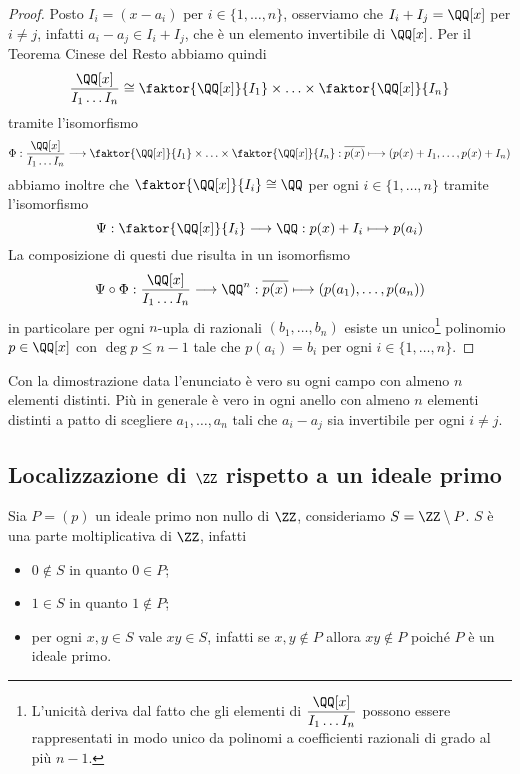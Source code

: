 \documentclass[11pt]{scrartcl}
\begin{document}
\begin{proof}
    Posto $I_i = (x - a_i)$ per $i \in \{1, \ldots, n\}$, osserviamo che 
    $I_i + I_j = \QQ[x]$ per $i \neq j$, infatti $a_i - a_j \in I_i + I_j$, 
    che è un elemento invertibile di $\QQ[x]$. Per il Teorema Cinese del Resto
    abbiamo quindi
    \[
        \frac{\QQ[x]}{I_1\ldots I_n} \cong \faktor{\QQ[x]}{I_1}\times 
        \ldots \times \faktor{\QQ[x]}{I_n}
    \]
    tramite l'isomorfismo
    \[
        \Phi: \frac{\QQ[x]}{I_1\ldots I_n} \longrightarrow \faktor{\QQ[x]}{I_1}\times 
        \ldots \times \faktor{\QQ[x]}{I_n}: \overline{p(x)}\longmapsto
        (p(x) + I_1, \ldots, p(x) + I_n)
    \]
    abbiamo inoltre che $\faktor{\QQ[x]}{I_i} \cong \QQ$ per ogni $i \in \{1, \ldots, n\}$
    tramite l'isomorfismo
    \[
        \Psi: \faktor{\QQ[x]}{I_i} \longrightarrow \QQ: p(x) + I_i \longmapsto p(a_i)
    \]
    La composizione di questi due risulta in un isomorfismo
    \[
        \Psi\circ\Phi: \frac{\QQ[x]}{I_1\ldots I_n}\longrightarrow \QQ^n:
        \overline{p(x)}\longmapsto (p(a_1), \ldots, p(a_n))
    \]
    in particolare per ogni $n$-upla di razionali $(b_1, \ldots, b_n)$ esiste
    un unico\footnote{
        L'unicità deriva dal fatto che gli elementi di $\displaystyle\frac{\QQ[x]}{I_1\ldots I_n}$
        possono essere rappresentati in modo unico da polinomi a coefficienti 
        razionali di grado al più $n - 1$.
    } polinomio $p \in \QQ[x]$ con $\deg p \leq n - 1$ tale che 
    $p(a_i) = b_i$ per ogni $i \in \{1, \ldots, n\}$.
\end{proof}

\begin{remark}
    Con la dimostrazione data l'enunciato è vero su ogni campo con almeno 
    $n$ elementi distinti. Più in generale è vero in ogni anello con almeno $n$
    elementi distinti a patto di scegliere $a_1, \ldots, a_n$ tali che $a_i - a_j$
    sia invertibile per ogni $i \neq j$.
\end{remark}

\newpage

\subsection{Localizzazione di $\ZZ$ rispetto a un ideale primo}

Sia $P = (p)$ un ideale primo non nullo di $\ZZ$, consideriamo $S = \ZZ \setminus P$.
$S$ è una parte moltiplicativa di $\ZZ$, infatti
\begin{itemize}
    \item $0 \notin S$ in quanto $0 \in P$;
    \item $1 \in S$ in quanto $1 \notin P$;
    \item per ogni $x, y \in S$ vale $xy \in S$, infatti se $x, y \notin P$
    allora $xy \notin P$ poiché $P$ è un ideale primo.
\end{itemize}
\end{document}
